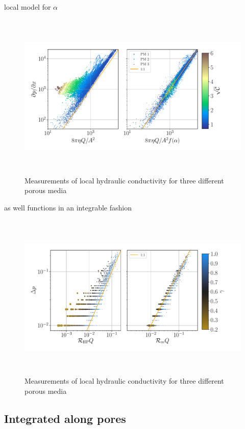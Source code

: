 \documentclass[draft]{agujournal2019}
\begin{document}
local model for $\alpha$

\begin{figure}\label{fig:local_and_integrated}
\includegraphics[height=8cm]{figures/infi_dpdx_combined.pdf}
\caption{Measurements of local hydraulic conductivity for three different porous media}
\end{figure}

as well functions in an integrable fashion

\begin{figure}\label{fig:local_and_integrated}
\includegraphics[height=8cm]{figures/integral_dp_combined.pdf}
\caption{Measurements of local hydraulic conductivity for three different porous media}
\end{figure}


\subsection{Integrated along pores}
\end{document}
